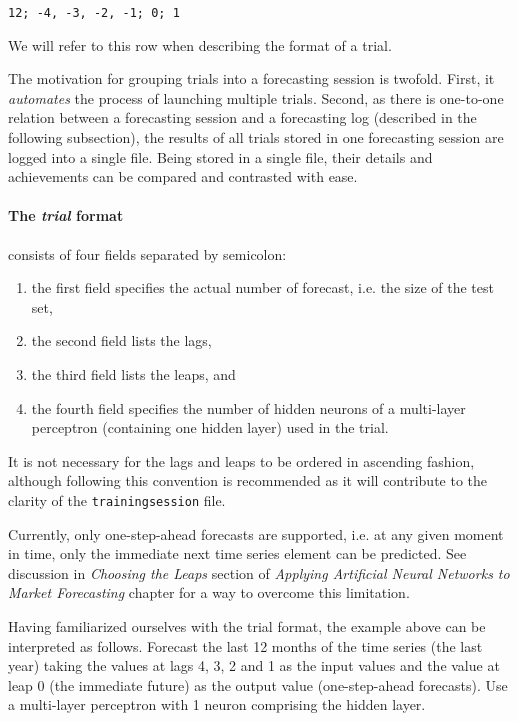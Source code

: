 \medskip

\begin{verbatim}
12; -4, -3, -2, -1; 0; 1
\end{verbatim}

\medskip

We will refer to this row when describing the format of a trial.

The motivation for grouping trials into a forecasting session is twofold. First, it \textit{automates} the process of launching multiple trials. Second, as there is one-to-one relation between a forecasting session and a forecasting log (described in the following subsection), the results of all trials stored in one forecasting session are logged into a single file. Being stored in a single file, their details and achievements can be compared and contrasted with ease.

\paragraph{The \textit{trial} format} consists of four fields separated by semicolon:
\begin{enumerate}
\item the first field specifies the actual number of forecast, i.e. the size of the test set,
\item the second field lists the lags,
\item the third field lists the leaps, and
\item the fourth field specifies the number of hidden neurons of a multi-layer perceptron (containing one hidden layer) used in the trial.
\end{enumerate}

It is not necessary for the lags and leaps to be ordered in ascending fashion, although following this convention is recommended as it will contribute to the clarity of the \texttt{trainingsession} file.

Currently, only one-step-ahead forecasts are supported, i.e. at any given moment in time, only the immediate next time series element can be predicted. See discussion in \textit{Choosing the Leaps} section of \textit{Applying Artificial Neural Networks to Market Forecasting} chapter for a way to overcome this limitation.

Having familiarized ourselves with the trial format, the example above can be interpreted as follows. Forecast the last 12 months of the time series (the last year) taking the values at lags 4, 3, 2 and 1 as the input values and the value at leap 0 (the immediate future) as the output value (one-step-ahead forecasts). Use a multi-layer perceptron with 1 neuron comprising the hidden layer.

